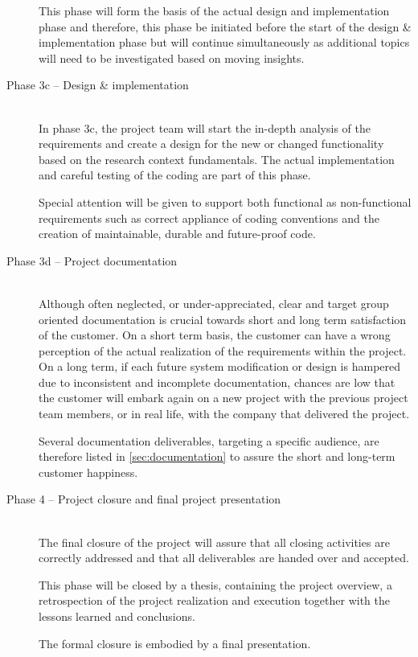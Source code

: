 \begin{description}
		This phase will form the basis of the actual design and implementation phase and therefore, this phase be initiated before the start of the design \& implementation phase but will continue simultaneously as additional  topics will need to be investigated based on moving insights. 

 	\item [Phase 3c -- Design \& implementation]~\\
	In phase 3c, the project team will start the in-depth analysis of the requirements and create a design for the new or changed functionality based on the research context fundamentals.
	The actual implementation and careful testing of the coding are part of this phase. 

	Special attention will be given to support both functional as non-functional requirements such as correct appliance of coding conventions and the creation of maintainable, durable and future-proof code.

 	\item [Phase 3d -- Project documentation]~\\
	Although often neglected, or under-appreciated, clear and target group oriented documentation is crucial towards short and long term satisfaction of the customer.
	On a short term basis, the customer can have a wrong perception of the actual realization of the requirements within the project. On a long term, if each future system modification or design is hampered due to inconsistent and incomplete documentation, chances are low that the customer will embark again on a new project with the previous project team members, or in real life, with the company that delivered the project.

	Several documentation deliverables, targeting a specific audience, are therefore listed in \autoref{sec:documentation} to assure the short and long-term customer happiness.

	\item [Phase 4 -- Project closure and final project presentation]~\\
	The final closure of the project will assure that all closing activities are correctly addressed and that all deliverables are handed over and accepted.

	This phase will be closed by a thesis, containing the project overview, a retrospection of the project realization and execution together with the lessons learned and conclusions.

	The formal closure is embodied by a final presentation.
\end {description}

